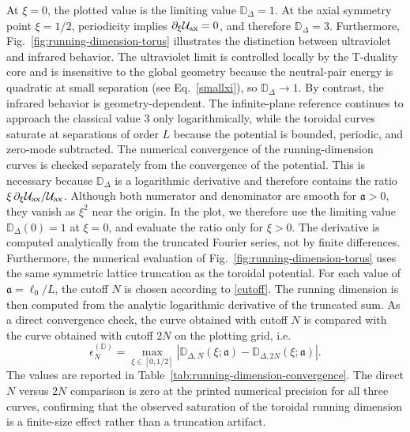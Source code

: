 \documentclass[nopacs,amsmath,amsfonts,amssymb,aps,superscriptaddress]{revtex4}
\begin{document}
At $\xi=0$, the plotted value is the limiting value $\mathbb D_\Delta= 1$. At the axial symmetry point $\xi=1/2$, periodicity implies $\partial_\xi\mathcal U_{\rm ax}=0$, and therefore $\mathbb D_\Delta=3$. Furthermore, Fig.~\ref{fig:running-dimension-torus} illustrates the distinction between ultraviolet and infrared behavior. The ultraviolet limit is controlled locally by the T-duality core and is insensitive to the global geometry because the neutral-pair energy is quadratic at small separation (see Eq.~\ref{smallxi}), so $\mathbb D_\Delta\to 1$. By contrast, the infrared behavior is geometry-dependent. The infinite-plane reference continues to approach the classical value $3$ only logarithmically, while the toroidal curves saturate at separations of order $L$ because the potential is bounded, periodic, and zero-mode subtracted.  The numerical convergence of the running-dimension curves is checked separately from the convergence of the potential. This is necessary because $\mathbb D_\Delta$ is a logarithmic derivative and therefore contains the ratio $\xi\,\partial_\xi\mathcal U_{\rm ax}/\mathcal U_{\rm ax}$. Although both numerator and denominator are smooth for $\mathfrak a>0$, they vanish as $\xi^2$ near the origin. In the plot, we therefore use the limiting value $\mathbb D_\Delta(0)=1$ at $\xi=0$, and evaluate the ratio only for $\xi>0$. The derivative is computed analytically from the truncated Fourier series, not by finite differences. Furthermore, the numerical evaluation of Fig.~\ref{fig:running-dimension-torus} uses the same symmetric lattice truncation as the toroidal potential. For each value of $\mathfrak a=\ell_0/L$, the cutoff $N$ is chosen according to \eqref{cutoff}. The running dimension is then computed from the analytic logarithmic derivative of the truncated sum. As a direct convergence check, the curve obtained with cutoff $N$ is compared with the curve obtained with cutoff $2N$ on the plotting grid, i.e.
\begin{equation}
  \epsilon_N^{(\mathbb D)}=\max_{\xi\in[0,1/2]}\left|\mathbb D_{\Delta,N}(\xi;\mathfrak a) -\mathbb D_{\Delta,2N}(\xi;\mathfrak a)\right|.
\end{equation}
The values are reported in Table~\ref{tab:running-dimension-convergence}. The direct $N$ versus $2N$ comparison is zero at the printed numerical precision for all three curves, confirming that the observed saturation of the toroidal running dimension is a finite-size effect rather than a truncation artifact.
\end{document}
